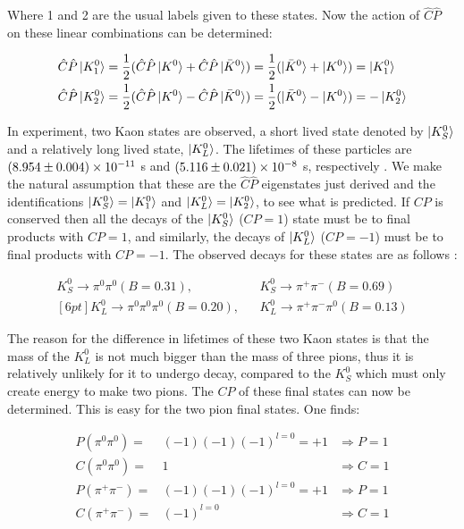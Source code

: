 \noindent Where 1 and 2 are the usual labels given to these states. Now the action of $\hat{C}\hat{P}$ on these linear combinations can be determined:

\smallskip

\begin{align*}
\hat{C}\hat{P} \ket{K^{0}_{1}} & = \frac{1}{2} (\hat{C}\hat{P} \ket{K^{0}} + \hat{C}\hat{P} \ket{\bar{K}^{0}}) = \frac{1}{2} (\ket{\bar{K}^{0}} + \ket{K^{0}}) = \ket{K^{0}_{1}} \\
\hat{C}\hat{P} \ket{K^{0}_{2}} & = \frac{1}{2} (\hat{C}\hat{P} \ket{K^{0}} - \hat{C}\hat{P} \ket{\bar{K}^{0}}) =   \frac{1}{2} (\ket{\bar{K}^{0}} - \ket{K^{0}}) = - \ket{K^{0}_{2}} \\
\end{align*} 

In experiment, two Kaon states are observed, a short lived state denoted by $\ket{K^{0}_{S}}$ and a relatively long lived state, $\ket{K^{0}_{L}}$. The lifetimes of these particles are $(8.954 \pm 0.004) \times 10^{-11}$ s and $(5.116 \pm 0.021) \times 10^{-8}$ s, respectively \cite{PDGKaons}. We make the natural assumption that these are the $\hat{C}\hat{P}$ eigenstates just derived and the identifications $\ket{K^{0}_{S}} = \ket{K^{0}_{1}}$ and $\ket{K^{0}_{L}} = \ket{K^{0}_{2}}$, to see what is predicted. If $CP$ is conserved then all the decays of the $\ket{K^{0}_{S}}$ ($CP = 1$) state must be to final products with $CP = 1$, and similarly, the decays of $\ket{K^{0}_{L}}$ ($CP = -1$) must be to final products with $CP = -1$. The observed decays for these states are as follows \cite[pg. 292]{Martin+Shaw}:

\begin{eqnarray*}    
K^{0}_S \rightarrow \pi^0 \pi^0 (B = 0.31),  &   &   K^{0}_{S} \rightarrow \pi^{+} \pi^{-} (B = 0.69)\\ [6pt]
K^{0}_L \rightarrow \pi^0 \pi^0 \pi^0 (B = 0.20),   &   &   K^{0}_{L} \rightarrow \pi^{+}  \pi^{-} \pi^0 (B =0.13)  
\end{eqnarray*}    

\noindent The reason for the difference in lifetimes of these two Kaon states is that the mass of the $K^{0}_L$ is not much bigger than the mass of three pions, thus it is relatively unlikely for it to undergo decay, compared to the $K^{0}_S$ which must only create energy to make two pions. The $CP$ of these final states can now be determined. This is easy for the two pion final states. One finds:

\begin{align}
{P} ({\pi^0 \pi^0})   = & (-1)(-1)(-1)^{l=0} = +1 & \Rightarrow P = 1  \\
{C} ({\pi^0 \pi^0})   = & 1                       & \Rightarrow C = 1  \\
{P} ({\pi^+ \pi^-})   = & (-1)(-1)(-1)^{l=0} = +1 & \Rightarrow P = 1  \\
\label{TwoPionFinalStateCalc}
{C} ({\pi^+ \pi^-})   = & (-1)^{l=0}             & \Rightarrow C = 1 
\end{align}

